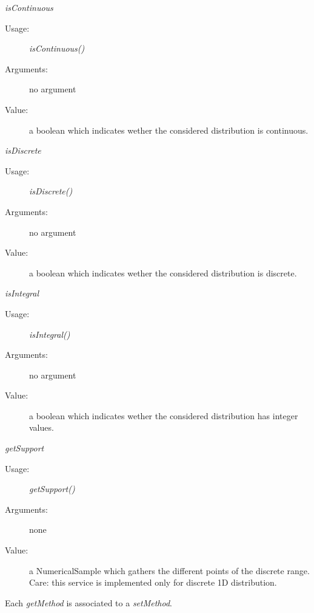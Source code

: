 \begin{description}
\begin{description}
\item \textit{isContinuous}
\begin{description}
\item[Usage:] \textit{isContinuous()}
\item[Arguments:] no argument
\item[Value:] a boolean which indicates wether the considered distribution is continuous.
\end{description}
\bigskip

\item \textit{isDiscrete}
\begin{description}
\item[Usage:] \textit{isDiscrete()}
\item[Arguments:] no argument
\item[Value:] a boolean which indicates wether the considered distribution is discrete.
\end{description}
\bigskip

\item \textit{isIntegral}
\begin{description}
\item[Usage:] \textit{isIntegral()}
\item[Arguments:] no argument
\item[Value:] a boolean which indicates wether the considered distribution has integer values.
\end{description}
\bigskip


\item \textit{getSupport}
\begin{description}
\item[Usage:] \textit{getSupport()}
\item[Arguments:] none
\item[Value:] a NumericalSample which gathers the different points of the discrete range. Care: this service is implemented only for discrete 1D distribution.
\end{description}

\end{description}

\item[Links:]  \rule{0pt}{1em}

\end{description}

Each  \textit{getMethod}  is associated to a \textit{setMethod}.


